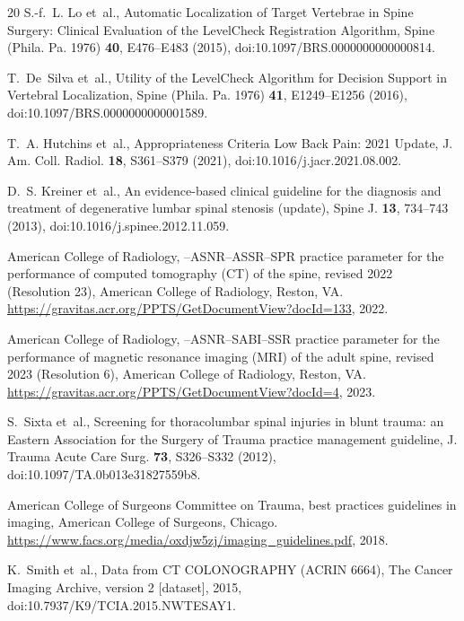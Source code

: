 \documentclass[aapm,mph,amsmath,amssymb,preprint,linenumbers]{revtex4-2}
\begin{document}
\begin{thebibliography}{20}
S.-f.~L. Lo et~al.,
\newblock Automatic Localization of Target Vertebrae in Spine Surgery: Clinical Evaluation of the {LevelCheck} Registration Algorithm,
\newblock Spine (Phila. Pa. 1976) {\bf 40}, E476--E483 (2015),
\newblock doi:10.1097/BRS.0000000000000814.

T.~De~Silva et~al.,
\newblock Utility of the {LevelCheck} Algorithm for Decision Support in Vertebral Localization,
\newblock Spine (Phila. Pa. 1976) {\bf 41}, E1249--E1256 (2016),
\newblock doi:10.1097/BRS.0000000000001589.

T.~A. Hutchins et~al.,
 {Appropriateness Criteria} Low Back Pain: 2021 Update,
\newblock J. Am. Coll. Radiol. {\bf 18}, S361--S379 (2021),
\newblock doi:10.1016/j.jacr.2021.08.002.

D.~S. Kreiner et~al.,
\newblock An evidence-based clinical guideline for the diagnosis and treatment of degenerative lumbar spinal stenosis (update),
\newblock Spine J. {\bf 13}, 734--743 (2013),
\newblock doi:10.1016/j.spinee.2012.11.059.

{American College of Radiology},
--{ASNR}--{ASSR}--{SPR} practice parameter for the performance of computed tomography ({CT}) of the spine, revised 2022 ({Resolution} 23),
\newblock American College of Radiology, Reston, VA. \url{https://gravitas.acr.org/PPTS/GetDocumentView?docId=133}, 2022.

{American College of Radiology},
--{ASNR}--{SABI}--{SSR} practice parameter for the performance of magnetic resonance imaging ({MRI}) of the adult spine, revised 2023 ({Resolution} 6),
\newblock American College of Radiology, Reston, VA. \url{https://gravitas.acr.org/PPTS/GetDocumentView?docId=4}, 2023.

S.~Sixta et~al.,
\newblock Screening for thoracolumbar spinal injuries in blunt trauma: an {Eastern Association for the Surgery of Trauma} practice management guideline,
\newblock J. Trauma Acute Care Surg. {\bf 73}, S326--S332 (2012),
\newblock doi:10.1097/TA.0b013e31827559b8.

{American College of Surgeons Committee on Trauma},
 best practices guidelines in imaging,
\newblock American College of Surgeons, Chicago. \url{https://www.facs.org/media/oxdjw5zj/imaging_guidelines.pdf}, 2018.

K.~Smith et~al.,
\newblock Data from {CT COLONOGRAPHY} ({ACRIN} 6664),
\newblock The Cancer Imaging Archive, version 2 [dataset], 2015,
\newblock doi:10.7937/K9/TCIA.2015.NWTESAY1.


\end{thebibliography}
\end{document}
